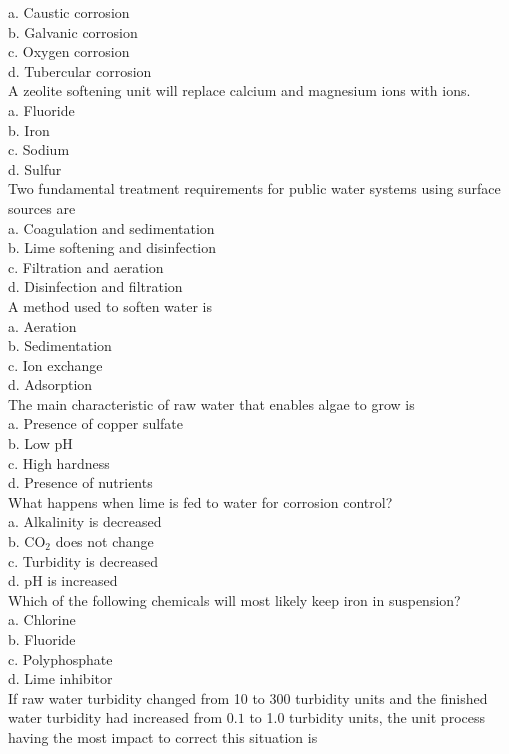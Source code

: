 a. Caustic corrosion\\
b. Galvanic corrosion\\
c. Oxygen corrosion\\
d. Tubercular corrosion\\
  A zeolite softening unit will replace calcium and magnesium ions with ions.\\
a. Fluoride\\
b. Iron\\
c. Sodium\\
d. Sulfur\\
Two fundamental treatment requirements for public water systems using surface sources are\\
a. Coagulation and sedimentation\\
b. Lime softening and disinfection\\
c. Filtration and aeration\\
d.  Disinfection and filtration\\
A method used to soften water is\\
a. Aeration\\
b. Sedimentation\\
c. Ion exchange\\
d. Adsorption\\
The main characteristic of raw water that enables algae to grow is\\
a. Presence of copper sulfate\\
b. Low pH\\
c. High hardness\\
d. Presence of nutrients\\
What happens when lime is fed to water for corrosion control?\\
a. Alkalinity is decreased\\
b. $\mathrm{CO}_{2}$ does not change\\
c. Turbidity is decreased\\
d. $\mathrm{pH}$ is increased\\
Which of the following chemicals will most likely keep iron in suspension?\\
a. Chlorine\\
b. Fluoride\\
c. Polyphosphate\\
d. Lime inhibitor\\
If raw water turbidity changed from 10 to 300 turbidity units and the finished water turbidity had increased from $0.1$ to 1.0 turbidity units, the unit process having the most impact to correct this situation is\\
